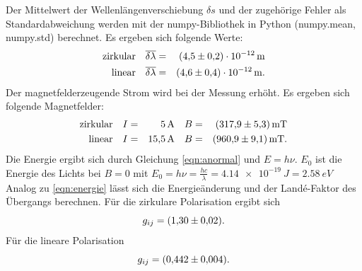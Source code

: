 %
%
Der Mittelwert der Wellenlängenverschiebung $\delta s$ und der zugehörige Fehler als Standardabweichung werden mit der numpy-Bibliothek in Python (numpy.mean, numpy.std) berechnet.
Es ergeben sich folgende Werte:
\begin{align*}
  \text{zirkular}  &&  \overline{\delta \lambda} &=& \SI{4.5 \pm 0.2 e-12}{m} \\
  \text{linear}    &&  \overline{\delta \lambda} &=& \SI{4.6 \pm 0.4 e-12}{m}. \\
\end{align*}
Der magnetfelderzeugende Strom wird bei der Messung erhöht.
Es ergeben sich folgende Magnetfelder:
\begin{align*}
  \text{zirkular}  &&   I &=& \SI{5}{A}     && B &=& \SI{317.9 \pm 5.3}{mT}\\
  \text{linear}    &&   I &=& \SI{15.5}{A}  && B &=& \SI{960.9 \pm 9.1}{mT}.\\
\end{align*}
Die Energie ergibt sich durch Gleichung \eqref{eqn:anormal} und $E= h \nu$.
$E_0$ ist die Energie des Lichts bei $B=0$ mit $E_0=h \nu = \frac{hc}{\lambda}= \SI{4.14e-19}{J}=\SI{2.58}{eV}$
Analog zu \eqref{eqn:energie} lässt sich die Energieänderung und der Landé-Faktor des Übergangs berechnen.
Für die zirkulare Polarisation ergibt sich
\begin{equation*}
  g_{ij} = \SI{1.30 \pm 0.02}{}.
\end{equation*}
Für die lineare Polarisation
\begin{equation*}
  g_{ij} = \SI{0.442 \pm 0.004}{}.
\end{equation*}

\FloatBarrier
%
